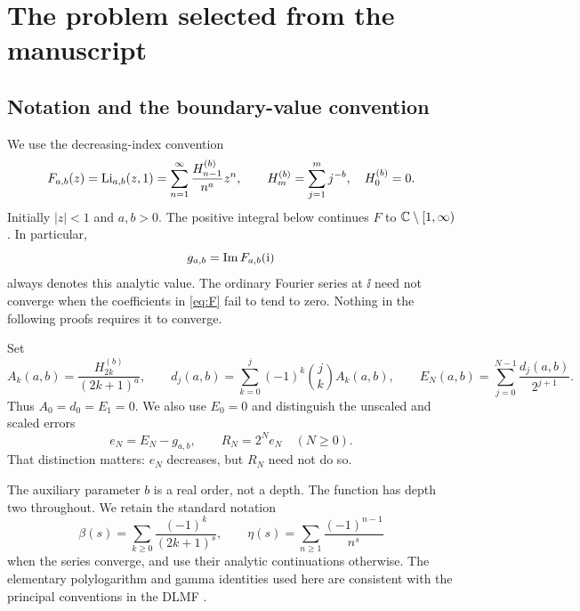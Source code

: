 \section{The problem selected from the manuscript}
\label{sec:context}
\subsection{Notation and the boundary-value convention}
We use the decreasing-index convention
\begin{equation}\label{eq:F}
 F_{a,b}(z)=\operatorname{Li}_{a,b}(z,1)
 =\sum_{n=1}^{\infty}\frac{H_{n-1}^{(b)}}{n^a}z^n,
 \qquad H_m^{(b)}=\sum_{j=1}^{m}j^{-b},\quad H_0^{(b)}=0.
\end{equation}
Initially $|z|<1$ and $a,b>0$. The positive integral below continues $F$ to $\mathbb C\setminus[1,\infty)$. In particular,
\[
 g_{a,b}=\operatorname{Im} F_{a,b}(\mathrm i)
\]
always denotes this analytic value. The ordinary Fourier series at $\ii$ need not converge when the coefficients in \eqref{eq:F} fail to tend to zero. Nothing in the following proofs requires it to converge.

Set
\begin{equation}\label{eq:Euler}
 A_k(a,b)=\frac{H_{2k}^{(b)}}{(2k+1)^a},\qquad
 d_j(a,b)=\sum_{k=0}^{j}(-1)^k\binom jk A_k(a,b),\qquad
 E_N(a,b)=\sum_{j=0}^{N-1}\frac{d_j(a,b)}{2^{j+1}}.
\end{equation}
Thus $A_0=d_0=E_1=0$. We also use $E_0=0$ and distinguish the unscaled and scaled errors
\begin{equation}\label{eq:errors}
 e_N=E_N-g_{a,b},\qquad R_N=2^N e_N\quad(N\ge0).
\end{equation}
That distinction matters: $e_N$ decreases, but $R_N$ need not do so.

The auxiliary parameter $b$ is a real order, not a depth. The function has depth two throughout. We retain the standard notation
\[
 \beta(s)=\sum_{k\ge0}\frac{(-1)^k}{(2k+1)^s},\qquad
 \eta(s)=\sum_{n\ge1}\frac{(-1)^{n-1}}{n^s}
\]
when the series converge, and use their analytic continuations otherwise. The elementary polylogarithm and gamma identities used here are consistent with the principal conventions in the DLMF \cite{DLMFpoly,DLMFgamma}.

